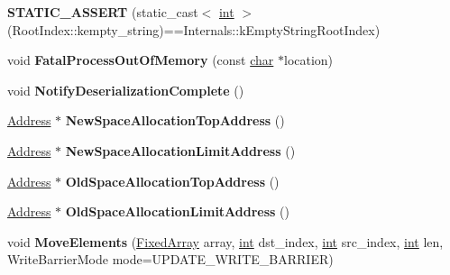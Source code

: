 \begin{DoxyCompactItemize}
{\bfseries S\+T\+A\+T\+I\+C\+\_\+\+A\+S\+S\+E\+RT} (static\+\_\+cast$<$ \mbox{\hyperlink{classint}{int}} $>$(Root\+Index\+::kempty\+\_\+string)==Internals\+::k\+Empty\+String\+Root\+Index)
\item 
\mbox{\label{classv8_1_1internal_1_1Heap_ac2186ae87a3cd28acde06a9f50d31b2c}} 
void {\bfseries Fatal\+Process\+Out\+Of\+Memory} (const \mbox{\hyperlink{classchar}{char}} $\ast$location)
\item 
\mbox{\label{classv8_1_1internal_1_1Heap_affbf46ca54d6b120a7b8df7da2100ab7}} 
void {\bfseries Notify\+Deserialization\+Complete} ()
\item 
\mbox{\label{classv8_1_1internal_1_1Heap_a36b006124ed0f7b75bfd7edc07ffe9b0}} 
\mbox{\hyperlink{classuintptr__t}{Address}} $\ast$ {\bfseries New\+Space\+Allocation\+Top\+Address} ()
\item 
\mbox{\label{classv8_1_1internal_1_1Heap_ad5014f8f0da530498e7614cba60013a6}} 
\mbox{\hyperlink{classuintptr__t}{Address}} $\ast$ {\bfseries New\+Space\+Allocation\+Limit\+Address} ()
\item 
\mbox{\label{classv8_1_1internal_1_1Heap_acd6e76f78e13576abf3edcd8e66c5075}} 
\mbox{\hyperlink{classuintptr__t}{Address}} $\ast$ {\bfseries Old\+Space\+Allocation\+Top\+Address} ()
\item 
\mbox{\label{classv8_1_1internal_1_1Heap_ae8c88266b8e03d1b1170ca54bb80dbea}} 
\mbox{\hyperlink{classuintptr__t}{Address}} $\ast$ {\bfseries Old\+Space\+Allocation\+Limit\+Address} ()
\item 
\mbox{\label{classv8_1_1internal_1_1Heap_a39d54663e31153c8de1dbef5ece60d02}} 
void {\bfseries Move\+Elements} (\mbox{\hyperlink{classv8_1_1internal_1_1FixedArray}{Fixed\+Array}} array, \mbox{\hyperlink{classint}{int}} dst\+\_\+index, \mbox{\hyperlink{classint}{int}} src\+\_\+index, \mbox{\hyperlink{classint}{int}} len, Write\+Barrier\+Mode mode=U\+P\+D\+A\+T\+E\+\_\+\+W\+R\+I\+T\+E\+\_\+\+B\+A\+R\+R\+I\+ER)
\item 
\mbox{\label{classv8_1_1internal_1_1Heap_ab4595d2b0b2b790d1f211c4298ba8d3d}} 

\end{DoxyCompactItemize}
